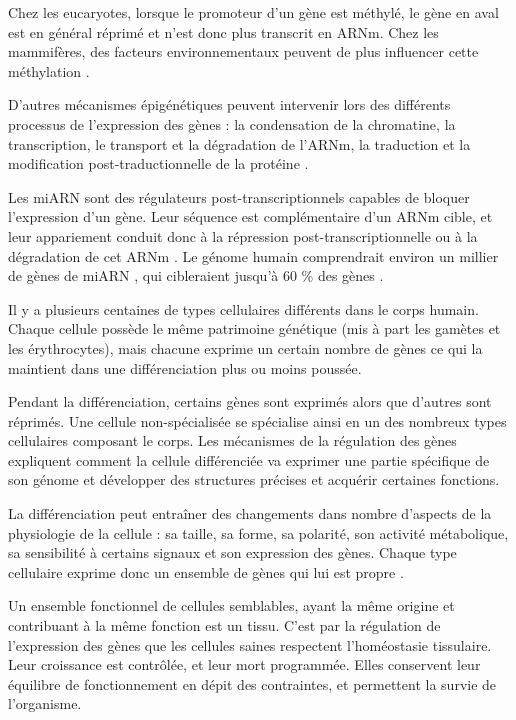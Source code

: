 			Chez les eucaryotes, lorsque le promoteur d'un gène est méthylé, le gène en aval est en général réprimé et n'est donc plus transcrit en \acs{ARNm}.
			Chez les mammifères, des facteurs environnementaux peuvent de plus influencer cette méthylation \citep{Szyf2011}.

			D'autres mécanismes épigénétiques peuvent intervenir lors des différents processus de l'expression des gènes : la condensation de la chromatine, la transcription, le transport et la dégradation de l'\acs{ARNm}, la traduction et la modification post-traductionnelle de la protéine \citep{Reik2007, Rosenfeld2009, Jia2012}.

			Les \ac{miARN} sont des régulateurs post-transcriptionnels capables de bloquer l'expression d'un gène.
			Leur séquence est complémentaire d'un \acs{ARNm} cible, et leur appariement conduit donc à la répression post-transcriptionnelle ou à la dégradation de cet \acs{ARNm} \citep{Kusenda2006, Bartel2009}.
			Le génome humain comprendrait environ un millier de gènes de \ac{miARN} \citep{Bentwich2005}, qui cibleraient jusqu'à 60 \% des gènes \citep{Lewis2005, Friedman2009}.

			Il y a plusieurs centaines de types cellulaires différents dans le corps humain.
			Chaque cellule possède le même patrimoine génétique (mis à part les gamètes et les érythrocytes), mais chacune exprime un certain nombre de gènes ce qui la maintient dans une différenciation plus ou moins poussée.

			Pendant la différenciation, certains gènes sont exprimés alors que d'autres sont réprimés.
			Une cellule non-spécialisée se spécialise ainsi en un des nombreux types cellulaires composant le corps.
			Les mécanismes de la régulation des gènes expliquent comment la cellule différenciée va exprimer une partie spécifique de son génome et développer des structures précises et acquérir certaines fonctions.

\pagebreak

			La différenciation peut entraîner des changements dans nombre d'aspects de la physiologie de la cellule : sa taille, sa forme, sa polarité, son activité métabolique, sa sensibilité à certains signaux et son expression des gènes.
			Chaque type cellulaire exprime donc un ensemble de gènes qui lui est propre \citep{Goring2012, Wirth2011, Li2012c}.

			Un ensemble fonctionnel de cellules semblables, ayant la même origine et contribuant à la même fonction est un tissu.
			C'est par la régulation de l'expression des gènes que les cellules saines respectent l'homéostasie tissulaire.
			Leur croissance est contrôlée, et leur mort programmée.
			Elles conservent leur équilibre de fonctionnement en dépit des contraintes, et permettent la survie de l'organisme.


